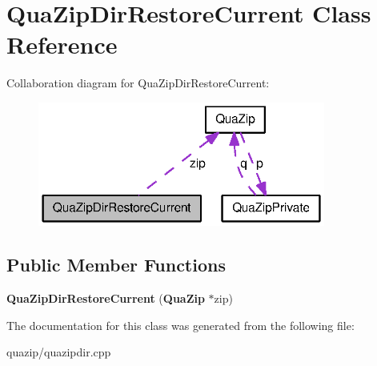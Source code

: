 \section{QuaZipDirRestoreCurrent Class Reference}
\label{classQuaZipDirRestoreCurrent}


Collaboration diagram for QuaZipDirRestoreCurrent:
\nopagebreak
\begin{figure}[H]
\begin{center}
\leavevmode
\includegraphics[width=268pt]{classQuaZipDirRestoreCurrent__coll__graph}
\end{center}
\end{figure}
\subsection*{Public Member Functions}
\begin{DoxyCompactItemize}
\item 
{\bfseries QuaZipDirRestoreCurrent} ({\bf QuaZip} $\ast$zip)\label{classQuaZipDirRestoreCurrent_a4890bc03bd2cf80363b2f2d4b0f83902}

\end{DoxyCompactItemize}


The documentation for this class was generated from the following file:\begin{DoxyCompactItemize}
\item 
quazip/quazipdir.cpp\end{DoxyCompactItemize}
